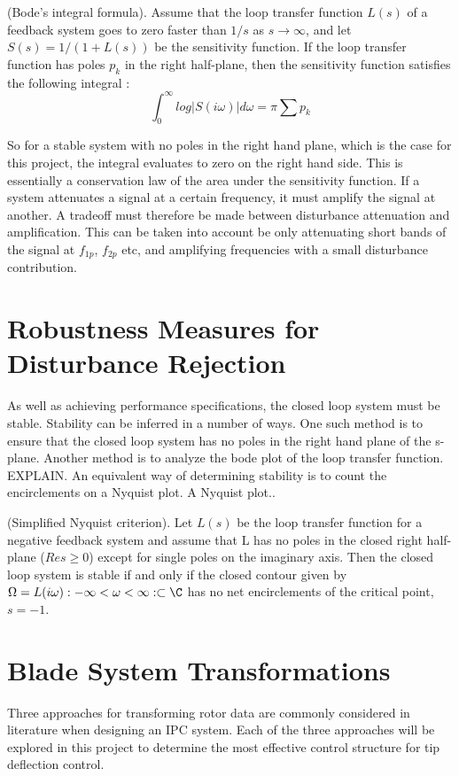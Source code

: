 \begin{theorem}
(Bode’s integral formula). Assume that the loop transfer function $L(s)$ of a feedback system goes to zero faster than $1/s$ as $s \rightarrow \infty$, and let $S(s) = 1/(1 + L(s))$ be the sensitivity function. If the loop transfer function has poles $p_k$ in the right half-plane, then the sensitivity function satisfies the following integral \cite{astrom2010feedback}:
$$\int_0^\infty log|S(i\omega)|d\omega = \pi \sum p_k$$
\end{theorem}
So for a stable system with no poles in the right hand plane, which is the case for this project, the integral evaluates to zero on the right hand side. This is essentially a conservation law of the area under the sensitivity function. If a system attenuates a signal at a certain frequency, it must amplify the signal at another. A tradeoff must therefore be made between disturbance attenuation and amplification. This can be taken into account be only attenuating short bands of the signal at $f_{1p}$, $f_{2p}$ etc, and amplifying frequencies with a small disturbance contribution.  


\section{Robustness Measures for Disturbance Rejection}
As well as achieving performance specifications, the closed loop system must be stable. Stability can be inferred in a number of ways. One such method is to ensure that the closed loop system has no poles in the right hand plane of the s-plane. Another method is to analyze the bode plot of the loop transfer function. EXPLAIN. An equivalent way of determining stability is to count the encirclements on a Nyquist plot. A Nyquist plot..
\begin{theorem}
(Simplified Nyquist criterion). Let $L(s)$ be the loop transfer function for a negative feedback system and assume that L has no poles in the closed right half-plane ($Res \ge 0$) except for single poles on the imaginary axis. Then the closed loop system is stable if and only if the closed contour given by $\Omega = {L(i\omega):-\infty < \omega < \infty}:\subset \C$ has no net encirclements of the critical point, $s = -1$.
\end{theorem}








\section{Blade System Transformations}
Three approaches for transforming rotor data are commonly considered in literature when designing an IPC system. Each of the three approaches will be explored in this project to determine the most effective control structure for tip deflection control. 

